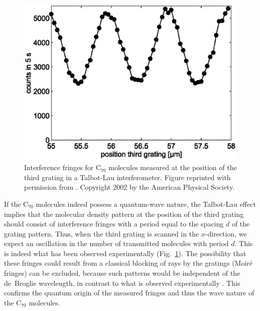 \documentclass[12pt,aps,floatfix,amsmath,amssymb,showpacs,nofootinbib]{revtex4-2}
\begin{document}
\begin{figure}
\begin{center}
\includegraphics[scale=.37]{c70-scan-n.eps}
\end{center}
\caption[Interference fringes for C$_{70}$
molecules]{\label{fig:c70-scan} Interference fringes for C$_{70}$
  molecules measured at the position of the third grating in a
  Talbot-Lau interferometer. Figure reprinted with permission from
  \cite{Brezger:2002:mu}. Copyright 2002 by the American Physical
  Society.}
\end{figure}

If the C$_{70}$ molecules indeed possess a quantum-wave nature, the
Talbot-Lau effect implies that the molecular density pattern at the
position of the third grating should consist of interference fringes
with a period equal to the spacing $d$ of the grating pattern. Thus,
when the third grating is scanned in the $x$-direction, we expect an
oscillation in the number of transmitted molecules with period $d$.
This is indeed what has been observed experimentally
\cite{Arndt:1999:rc,Arndt:2002:bo,Brezger:2002:mu,Nairz:2003:um,%
Hornberger:2003:tv} (Fig.~\ref{fig:c70-scan}).  The
possibility that these fringes could result from a classical blocking
of rays by the gratings (Moir\'e fringes) can be excluded, because such
patterns would be independent of the de~Broglie wavelength, in
contrast to what is observed experimentally
\cite{Brezger:2002:mu,Hackermuller:2003:uu}.  This confirms the
quantum origin of the measured fringes and thus the wave nature of the
C$_{70}$ molecules.
\end{document}

